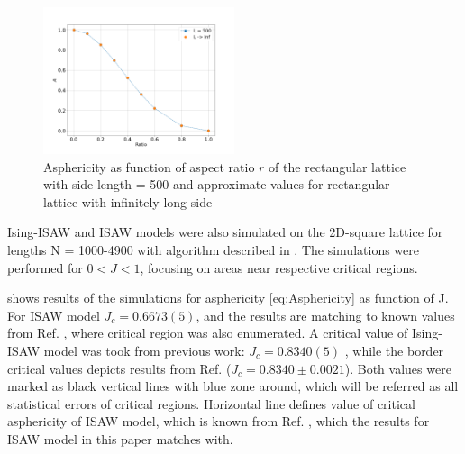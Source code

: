 \begin{figure}[h]
    \centering
    \includegraphics[width=0.5\textwidth]{Images/A_r.png}
    \caption{Asphericity as function of aspect ratio $r$ of the rectangular lattice with side length = 500 and approximate values for rectangular lattice with infinitely long side}
    \label{fig:A_r}
\end{figure}


Ising-ISAW and ISAW models were also simulated on the 2D-square lattice for lengths N = 1000-4900 with algorithm described in \cite{faizullina2021critical}. 
The simulations were performed for $0 < J < 1$, focusing on areas near respective critical regions.

 shows results of the simulations for asphericity \eqref{eq:Asphericity} as function of J. 
For ISAW model $J_{c} = 0.6673(5)$, and the results are matching to known values from  Ref. \cite{Caracciolo2011}, where critical region was also enumerated.
A critical value of Ising-ISAW model was took from previous work: $J_{c} = 0.8340(5)$ \cite{faizullina2021critical}, while the border critical values depicts results from Ref.\cite{Foster2021} ($J_{c} = 0.8340 \pm 0.0021$). 
Both values were marked as black vertical lines with blue zone around, which will be referred as all statistical errors of critical regions. 
Horizontal line defines value of critical asphericity of ISAW model, which is known from Ref. \cite{Caracciolo2011}, which the results for ISAW model in this paper matches with.

